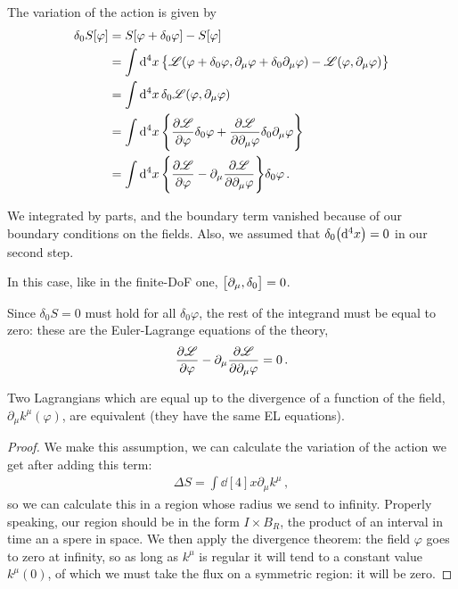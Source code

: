 \documentclass[main.tex]{subfiles}
\begin{document}
The variation of the action is given by 
%
\begin{align}
\delta_0 S [\varphi ] &= S [ \varphi + \delta_0 \varphi ] - S[\varphi ]  \\
&= \int \dd[4]{x} \qty{ \mathscr{L} (\varphi + \delta_0 \varphi , \partial_{\mu } \varphi + \delta_0 \partial_{\mu } \varphi ) - \mathscr{L} (\varphi, \partial_{\mu } \varphi )}  \\
&= \int \dd[4]{x } \delta_0 \mathscr{L} (\varphi , \partial_{\mu }\varphi )  \\
&= \int \dd[4]{x} 
\qty{ \pdv{\mathscr{L}}{\varphi } \delta_0 \varphi  + \pdv{\mathscr{L}}{\partial_{\mu } \varphi } \delta_0\partial_{\mu }  \varphi  }  \\
&= \int \dd[4]{x} \qty{\pdv{\mathscr{L}}{\varphi } - \partial_{\mu }\pdv{\mathscr{L}}{\partial_{\mu } \varphi }} \delta_0 \varphi 
\,.
\end{align}

We integrated by parts, and the boundary term vanished because of our boundary conditions on the fields. 
Also, we assumed that \(\delta_0 \qty(\dd[4]{x}) =0 \) in our second step.

In this case, like in the finite-DoF one, \(\qty[\partial_{\mu }, \delta_0 ] =0\). 

Since \(\delta_0 S = 0\) must hold for all \(\delta_0 \varphi \), the rest of the integrand must be equal to zero: these are the Euler-Lagrange equations of the theory, 
%
\begin{align}
\pdv{\mathscr{L}}{\varphi } - \partial_{\mu }\pdv{\mathscr{L}}{\partial_{\mu } \varphi } =0
\,.
\end{align}


\begin{claim}
Two Lagrangians which are equal up to the divergence of a function of the field, \(\partial_{\mu } k^{\mu }(\varphi )\), are equivalent (they have the same EL equations).
\end{claim} 

\begin{proof}
We make this assumption, we can calculate the variation of the action we get after adding this term:
%
\begin{align}
\Delta S = \int \dd[4]{x} \partial_{\mu } k^{\mu } 
\,,
\end{align}
%
so we can calculate this in a region whose radius we send to infinity. Properly speaking, our region should be in the form \(I \times B_R\), the product of an interval in time an a spere in space. We then apply the divergence theorem: the field \(\varphi \) goes to zero at infinity, so as long as \(k^{\mu }\) is regular it will tend to a constant value \(k^{\mu } (0)\), of which we must take the flux on a symmetric region: it will be zero.
\end{proof}
\end{document}
